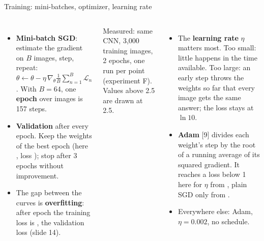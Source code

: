 \documentclass[aspectratio=169,10pt]{beamer}
\renewcommand{\cite}[1]{{\scriptsize\color{cTok}[#1]}}
\newcommand{\key}[1]{\textbf{\color{cAtt}#1}}
\begin{document}
\begin{frame}{Training: mini-batches, optimizer, learning rate}
\begin{columns}[T,onlytextwidth]
\vspace{0.8mm}
\raggedright\footnotesize
\begin{itemize}
  \item \key{Mini-batch SGD}: estimate the gradient on $B$ images, step, repeat:
        $\theta\leftarrow\theta-\eta\,\nabla_\theta\frac1B\sum_{n=1}^{B}\mathcal L_n$.
        With $B=64$, one \key{epoch} over \nTrain{} images is 157 steps.
  \item \key{Validation} after every epoch. Keep the weights of the best epoch (here \bestEpoch, loss \bestVal);
        stop after 3 epochs without improvement.
  \item The gap between the curves is \textbf{overfitting}: after epoch \epochsCnn{} the training loss is
        \lastTrain, the validation loss \lastVal{} (slide 14).
\end{itemize}
\centering
{}

\vspace{-0.5mm}
{\scriptsize\color{cTok}Measured: same CNN, 3{,}000 training images, 2 epochs, one run per point (experiment F). Values above 2.5 are drawn at 2.5.}

\vspace{0.8mm}
\raggedright\footnotesize
\begin{itemize}
  \item The \key{learning rate} $\eta$ matters most. Too small: little happens in the time
        available. Too large: an early step throws the weights so far that every image gets the same
        answer; the loss stays at $\ln10$.
  \item \key{Adam} \cite{9} divides each weight's step by the root of a running average of its squared
        gradient. It reaches a loss below 1 here for $\eta$ from \lrAdamRange, plain SGD only from \lrSgdRange.
  \item Everywhere else: Adam, $\eta=0.002$, no schedule.
\end{itemize}
\end{columns}
\end{frame}
\end{document}
